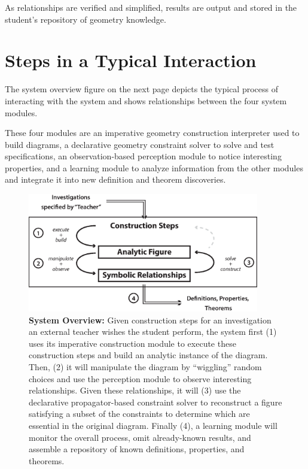 As relationships are verified and simplified, results are output and
stored in the student's repository of geometry knowledge.


\section{Steps in a Typical Interaction}

The system overview figure on the next page depicts the typical
process of interacting with the system and shows relationships between
the four system modules.

These four modules are an imperative geometry construction interpreter
used to build diagrams, a declarative geometry constraint solver to
solve and test specifications, an observation-based perception module
to notice interesting properties, and a learning module to analyze
information from the other modules and integrate it into new
definition and theorem discoveries.

\newpage

\begin{figure}[h!]
\centering
\includegraphics[width=0.9\textwidth]{diagrams/Representations.eps}
\captionsetup{labelformat=empty}
\caption{{\bf System Overview:} Given construction steps for an
  investigation an external teacher wishes the student perform, the
  system first (1) uses its imperative construction module to execute
  these construction steps and build an analytic instance of the
  diagram. Then, (2) it will manipulate the diagram by ``wiggling''
  random choices and use the perception module to observe interesting
  relationships. Given these relationships, it will (3) use the
  declarative propagator-based constraint solver to reconstruct a
  figure satisfying a subset of the constraints to determine which are
  essential in the original diagram. Finally (4), a learning module
  will monitor the overall process, omit already-known results, and
  assemble a repository of known definitions, properties, and
  theorems.}
\end{figure}

